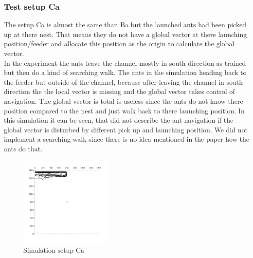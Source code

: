 \documentclass[11pt]{article}
\begin{document}
	\subsubsection{Test setup Ca}
		The setup Ca is almost the same than Ba but the launched ants had been picked up at there nest. That means they do not have a global vector at there launching position/feeder and allocate this position as the origin to calculate the global vector. \\
In the experiment the ants leave the channel mostly in south direction as trained but then do a kind of searching walk. The ants in the simulation heading back to the feeder but outside of the channel, because after leaving the channel in south direction the the local vector is missing and the global vector takes control of navigation. The global vector is total is useless since the ants do not know there position compared to the nest and just walk back to there launching position. In this simulation it can be seen, that \cite{wehner} did not describe the ant navigation if the global vector is disturbed by different pick up and launching position. We did not implement a searching walk since there is no idea mentioned in the paper how the ants do that. 
\begin{figure}
	\includegraphics[width=0.4\textwidth]{test_Ca.png}
	\caption{Simulation setup Ca}
	\label{fig:Ca}
\end{figure}
\end{document}

